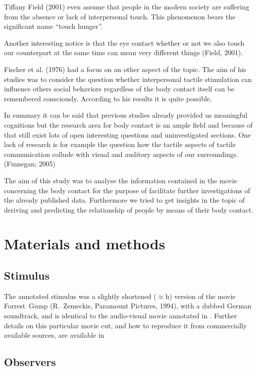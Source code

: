 \documentclass[10pt,a4paper,twocolumn]{article}
\begin{document}
Tiffany Field (2001) even assume that people in the modern society are
suffering from the absence or lack of interpersonal touch. This phenomenon
bears the significant name “touch hunger”.

Another interesting notice is that the eye contact whether or not we also touch
our counterpart at the same time can mean very different  things (Field, 2001).

Fischer et al. (1976) had a focus on an other aspect of the topic. The aim of
his studies was to consider the question whether interpersonal tactile
stimulation can influence others social behaviors regardless of the body
contact itself can be remembered consciously. According to his results it is
quite possible.

In summary it can be said that previous studies already provided us meaningful
cognitions but the research area for body contact is an ample field and because
of that still exist lots of open interesting questions and uninvestigated
sections.  One lack of research is for example the question how the tactile
aspects of tactile communication collude with visual and auditory aspects of
our surroundings. (Finnegan; 2005)

The aim of this study was to analyse the information contained in the movie
concerning the body contact for the purpose of facilitate further
investigations of the already published data. Furthermore we tried to get
insights in the topic of deriving and predicting the relationship of people by
means of their body contact.


\section*{Materials and methods}

\subsection*{Stimulus}

The annotated stimulus was a slightly shortened ($\approx$\unit[2]{h}) version
of the movie Forrest~Gump (R.~Zemeckis, Paramount Pictures, 1994), with a dubbed
German soundtrack, and is identical to the audio-visual movie annotated in
\cite{LRS+2015,HH2016}. Further details on this particular movie cut, and how
to reproduce it from commercially available sources, are available in
\cite{HAK+16}

\subsection*{Observers} %
\end{document}
